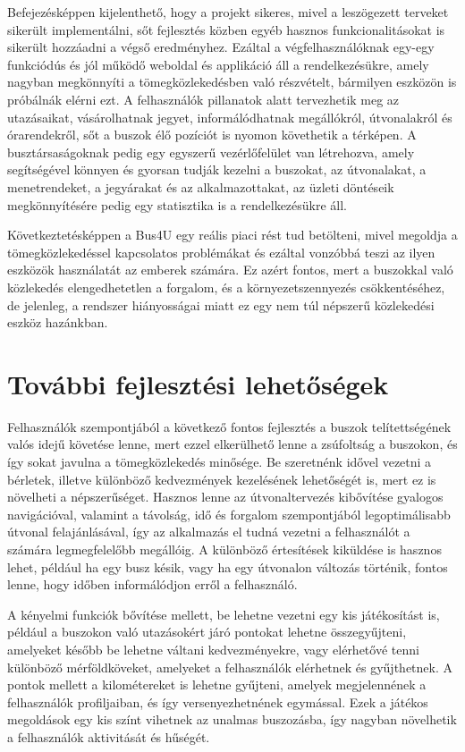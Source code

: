Befejezésképpen kijelenthető, hogy a projekt sikeres, mivel a leszögezett terveket sikerült implementálni, sőt fejlesztés közben egyéb hasznos funkcionalitásokat is sikerült hozzáadni a végső eredményhez. Ezáltal a végfelhasználóknak egy-egy funkciódús és jól működő weboldal és applikáció áll a rendelkezésükre, amely nagyban megkönnyíti a tömegközlekedésben való részvételt, bármilyen eszközön is próbálnák elérni ezt. A felhasználók pillanatok alatt tervezhetik meg az utazásaikat, vásárolhatnak jegyet, informálódhatnak megállókról, útvonalakról és órarendekről, sőt a buszok élő pozíciót is nyomon követhetik a térképen. A busztársaságoknak pedig egy egyszerű vezérlőfelület van létrehozva, amely segítségével könnyen és gyorsan tudják kezelni a buszokat, az útvonalakat, a menetrendeket, a jegyárakat és az alkalmazottakat, az üzleti döntéseik megkönnyítésére pedig egy statisztika is a rendelkezésükre áll.

Következtetésképpen a Bus4U egy reális piaci rést tud betölteni, mivel megoldja a tömegközlekedéssel kapcsolatos problémákat és ezáltal vonzóbbá teszi az ilyen eszközök használatát az emberek számára. Ez azért fontos, mert a buszokkal való közlekedés elengedhetetlen a forgalom, és a környezetszennyezés csökkentéséhez, de jelenleg, a rendszer hiányosságai miatt ez egy nem túl népszerű közlekedési eszköz hazánkban.

\section{További fejlesztési lehetőségek}

Felhasználók szempontjából a következő fontos fejlesztés a buszok telítettségének valós idejű követése lenne, mert ezzel elkerülhető lenne a zsúfoltság a buszokon, és így sokat javulna a tömegközlekedés minősége. Be szeretnénk idővel vezetni a bérletek, illetve különböző kedvezmények kezelésének lehetőségét is, mert ez is növelheti a népszerűséget. Hasznos lenne az útvonaltervezés kibővítése gyalogos navigációval, valamint a távolság, idő és forgalom szempontjából legoptimálisabb útvonal felajánlásával, így az alkalmazás el tudná vezetni a felhasználót a számára legmegfelelőbb megállóig. A különböző értesítések kiküldése is hasznos lehet, például ha egy busz késik, vagy ha egy útvonalon változás történik, fontos lenne, hogy időben informálódjon erről a felhasználó.

A kényelmi funkciók bővítése mellett, be lehetne vezetni egy kis játékosítást is, például a buszokon való utazásokért járó pontokat lehetne összegyűjteni, amelyeket később be lehetne váltani kedvezményekre, vagy elérhetővé tenni különböző mérföldköveket, amelyeket a felhasználók elérhetnek és gyűjthetnek. A pontok mellett a kilométereket is lehetne gyűjteni, amelyek megjelennének a felhasználók profiljaiban, és így versenyezhetnének egymással. Ezek a játékos megoldások egy kis színt vihetnek az unalmas buszozásba, így nagyban növelhetik a felhasználók aktivitását és hűségét.

